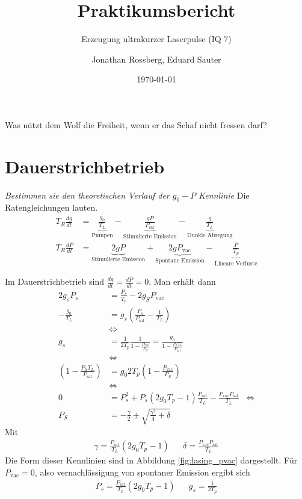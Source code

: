\documentclass[11pt,twoside=true]{scrartcl}
\title{Praktikumsbericht}
\subtitle{Erzeugung ultrakurzer Laserpulse (IQ 7)}
\author{Jonathan Rossberg,
      Eduard Sauter}
\date{\today}
\newcommand{\dd}[2]{\frac{d{#1}}{d{#2}}}
\begin{document}
\maketitle
\begin{text}
Was nützt dem Wolf die Freiheit, wenn er das Schaf nicht fressen darf?
\end{text}
\newpage
\section{Dauerstrichbetrieb}
\textsl{Bestimmen sie den theoretischen Verlauf der $g_0-P$ Kennlinie} 
%
Die Ratengleichungen lauten.
\begin{align*}
  T_R \dd{g}{t} & 
    = \underbrace{\frac{g_0}{T_L}}_{\text{Pumpen}}   
    - \underbrace{\frac{g P}{ P_{\text{sat}}}}_{\text{Stimulierte Emission}}  
    - \underbrace{\frac{g}{T_L}}_{\text{Dunkle Abregung}} \\
  T_R \dd{P}{t} & 
    = \underbrace{2 g P}_{\text{Stimulierte Emission}}  
    + \underbrace{2 g P_\text{vac}}_{\text{Spontane Emission}}  
    - \underbrace{\frac{P}{T_p}}_{\text{Lineare Verluste}}
\end{align*}


Im Dauerstrichbetrieb sind $\dd{g}{t} = \dd{P}{t} = 0$. 
Man erhält dann
%
\begin{align*}
  2 g_s P_s  & = \frac{P_s}{T_p} - 2 g_S P_\text{vac} \\
  - \frac{g_0}{T_L}  & = g_s\left( \frac{P_s}{P_\text{sat}} - \frac{1}{T_L} \right) \\
  & \iff  \\
  g_s & = \frac{1}{2 T_p} \frac{1}{1- \frac{P_\text{vac}}{P_S}} = \frac{g_0}{1 - \frac{P_S T_L}{P_\text{sat}}} \\
  & \iff   \\
  \left( 1 - \frac{P_S T_L}{P_\text{sat}} \right)  & = g_0 2 T_p \left( 1 - \frac{P_\text{vac}}{P_S} \right) \\
  & \iff  \\
  0 & = P_s^2 + P_s (2 g_0 T_p - 1) \frac{P_\text{sat}}{T_L} - \frac{P_\text{vac}P_\text{sat}}{T_L}
  & \iff \\
  P_S & = - \frac{\gamma}{2} \pm \sqrt{\frac{\gamma^2}{4} + \delta}
\end{align*}
Mit 
%
\begin{align*}
  \gamma = \frac{P_\text{sat}}{T_L} (2 g_0 T_p - 1) && \delta = \frac{P_\text{vac} P_\text{sat}}{T_L}
\end{align*}
%
Die Form dieser Kennlinien sind in Abbildung \ref{fig:lasing_pvac} dargestellt.
%
Für $P_\text{vac} = 0 $, also vernachlässigung von spontaner Emission ergibt sich
%
\begin{align*}
  P_s = \frac{P_\text{sat}}{T_L} (2 g_0 T_p - 1) && g_s = \frac{1}{2 T_p}
\end{align*}
%
\end{document}
